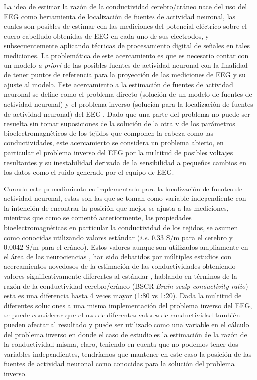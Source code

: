 La idea de estimar la razón de la conductividad cerebro/cráneo nace del uso del EEG como herramienta de localización de fuentes de actividad neuronal, las cuales son posibles de estimar con las mediciones del potencial eléctrico sobre el cuero cabelludo obtenidas de EEG en cada uno de sus electrodos, y subsecuentemente aplicando técnicas de procesamiento digital de señales en tales mediciones. La problemática de este acercamiento es que es necesario contar con un modelo \emph{a priori} de las posibles fuentes de actividad neuronal con la finalidad de tener puntos de referencia para la proyección de las mediciones de EEG y su ajuste al modelo. Este acercamiento a la estimación de fuentes de actividad neuronal se define como el problema directo (solución de un modelo de fuentes de actividad neuronal) y el problema inverso (solución para la localización de fuentes de actividad neuronal) del EEG \cite{Hallez2007}. Dado que una parte del problema no puede ser resuelta sin tomar suposiciones de la solución de la otra y de los parámetros bioelectromagnéticos de los tejidos que componen la cabeza como las conductividades, este acercamiento se considera un problema abierto, en particular el problema inverso del EEG por la multitud de posibles voltajes resultantes y su inestabilidad derivada de la sensibilidad a pequeños cambios en los datos como el ruido generado por el equipo de EEG. 

Cuando este procedimiento es implementado para la localización de fuentes de actividad neuronal, estas son las que se toman como variable independiente con la intención de encontrar la posición que mejor se ajusta a las mediciones, mientras que como se comentó anteriormente, las propiedades bioelectromagnéticas en particular la conductividad de los tejidos, se asumen como conocidas utilizando valores estándar (\emph{i.e.} $0.33\text{ S/m}$ para el cerebro y $0.0042 \text{ S/m}$ para el cráneo). Estos valores aunque son utilizados ampliamente en el área de las neurociencias \cite{Rush1968,Rush1969,Cohen1983}, han sido debatidos por múltiples estudios con acercamientos novedosos de la estimación de las conductividades obteniendo valores significativamente diferentes al estándar \cite{McCann2019}, hablando en términos de la razón de la conductividad cerebro/cráneo (BSCR \emph{Brain-scalp-conductivity-ratio}) esta es una diferencia hasta 4 veces mayor (1:80 vs 1:20). Dada la multitud de diferentes soluciones a una misma implementación del problema inverso del EEG, se puede considerar que el uso de diferentes valores de conductividad también pueden afectar al resultado y puede ser utilizado como una variable en el cálculo del problema inverso en donde el caso de estudio es la estimación de la razón de la conductividad misma, claro, teniendo en cuenta que no podemos tener dos variables independientes, tendríamos que mantener en este caso la posición de las fuentes de actividad neuronal como conocidas para la solución del problema inverso. 

